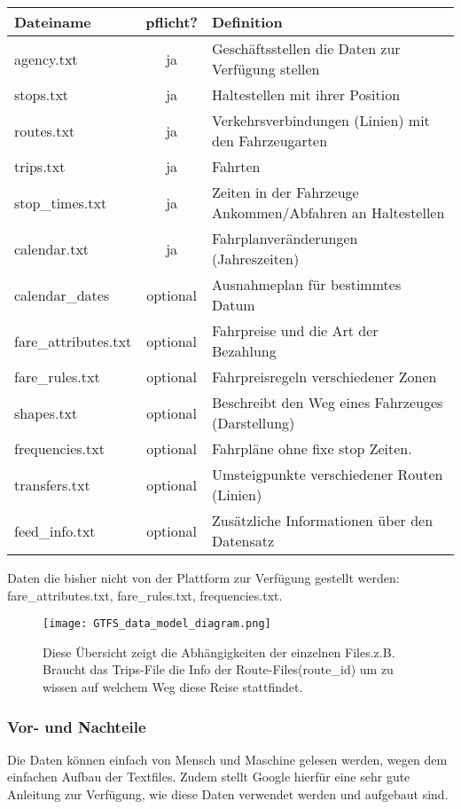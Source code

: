 \begin{tabular}{|l|c|l|}  \hline
	Dateiname & pflicht? & Definition \\ \hline
	agency.txt & ja & Geschäftsstellen die Daten zur Verfügung stellen \\ \hline
	stops.txt & ja & Haltestellen mit ihrer Position \\ \hline
	routes.txt & ja & Verkehrsverbindungen (Linien) mit den Fahrzeugarten \\ \hline %
	trips.txt & ja & Fahrten  \\ \hline												%
	stop\_times.txt & ja & Zeiten in der Fahrzeuge Ankommen/Abfahren an Haltestellen \\ \hline
	calendar.txt & ja & Fahrplanveränderungen (Jahreszeiten) \\ \hline
	calendar\_dates & optional & Ausnahmeplan für bestimmtes Datum \\ \hline
	fare\_attributes.txt & optional & Fahrpreise und die Art der Bezahlung \\ \hline
	fare\_rules.txt & optional & Fahrpreisregeln verschiedener Zonen  \\ \hline
	shapes.txt & optional & Beschreibt den Weg eines Fahrzeuges (Darstellung) \\ \hline
	frequencies.txt & optional & Fahrpläne ohne fixe stop Zeiten. \\ \hline
	transfers.txt & optional & Umsteigpunkte verschiedener Routen (Linien) \\ \hline
	feed\_info.txt & optional & Zusätzliche Informationen über den Datensatz \\ \hline	
\end{tabular}
\cite{gtfsInhalt}
\newline
\newline
\newline
Daten die bisher nicht von der Plattform zur Verfügung gestellt werden: fare\_attributes.txt, fare\_rules.txt, frequencies.txt. 

\begin{figure}[]
	\centering
	\texttt{[image: GTFS\_data\_model\_diagram.png]}
 	\caption{Diese Übersicht zeigt die Abhängigkeiten der einzelnen Files.z.B. Braucht das Trips-File die Info der Route-Files(route\_id) um zu wissen auf welchem Weg diese Reise stattfindet.  \cite{gtfsUebersicht}}
	\label{fig:gtfs-uebersicht}
\end{figure}

 

\subsubsection{Vor- und Nachteile}
\label{sec:gtfs-vornachteile}
Die Daten können einfach von Mensch und Maschine gelesen werden, wegen dem einfachen Aufbau der Textfiles. Zudem stellt Google hierfür eine sehr gute Anleitung zur Verfügung, wie diese Daten verwendet werden und aufgebaut sind.

